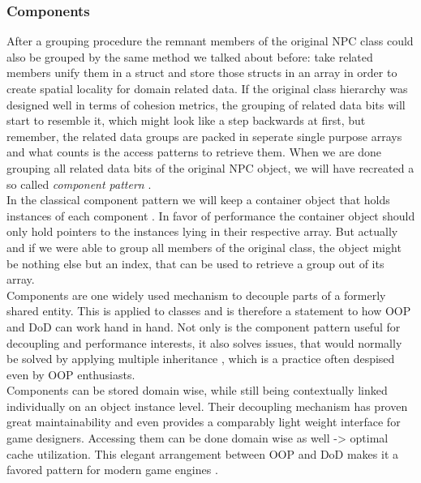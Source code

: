 \subsubsection{Components}
After a grouping procedure the remnant members of the original NPC class could also be grouped by the same method we talked about before: take related members unify them in a struct and store those structs in an array in order to create spatial locality for domain related data. If the original class hierarchy was designed well in terms of cohesion metrics, the grouping of related data bits will start to resemble it, which might look like a step backwards at first, but remember, the related data groups are packed in seperate single purpose arrays and what counts is the access patterns to retrieve them. When we are done grouping all related data bits of the original NPC object, we will have recreated a so called \textit{component pattern} .\\
In the classical component pattern we will keep a container object that holds instances of each component . In favor of performance the container object should only hold pointers to the instances lying in their respective array. But actually and if we were able to group all members of the original class, the object might be nothing else but an index, that can be used to retrieve a group out of its array.\\
Components are one widely used mechanism to decouple parts of a formerly shared entity. This is applied to classes and is therefore a statement to how OOP and DoD can work hand in hand. Not only is the component pattern useful for decoupling and performance interests, it also solves issues, that would normally be solved by applying multiple inheritance , which is a practice often despised even by OOP enthusiasts.\\
Components can be stored domain wise, while still being contextually linked individually on an object instance level. Their decoupling mechanism has proven great maintainability and even provides a comparably light weight interface for game designers. Accessing them can be done domain wise as well -> optimal cache utilization. This elegant arrangement between OOP and DoD makes it a favored pattern for modern game engines .

